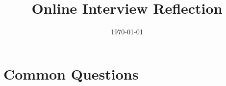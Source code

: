 



\title{Online Interview Reflection}

\author{\myName{}}
\date{\today}
\makeatletter
\fancyfoot[L]{\scshape \MakeLowercase{\@author}}
\fancyfoot[R]{{\scshape \MakeLowercase{\@title}}\quad{\LARGE\sfrac{\thepage}{\pageref*{LastPage}}}}
\makeatother



\maketitle%
\thispagestyle{fancy}

\section{Common Questions}


